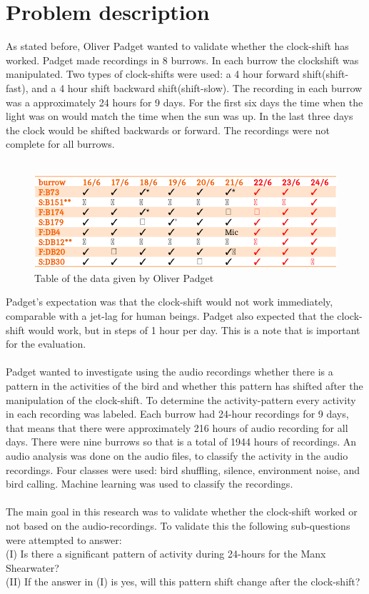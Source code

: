 \documentclass[a4paper]{article}
\begin{document}
\section*{Problem description}
As stated before, Oliver Padget wanted to validate whether the clock-shift has worked. Padget made recordings in 8 burrows. In each burrow the clockshift was manipulated. Two types of clock-shifts were used: a 4 hour forward shift(shift-fast), and a 4 hour shift backward shift(shift-slow). The recording in each burrow was a approximately 24 hours for 9 days. For the first six days the time when the light was on would match the time when the sun was up. In the last three days the clock would be shifted backwards or forward. The recordings were not complete for all burrows.\\\\
\begin{figure}[h]
\caption{Table of the data given by Oliver Padget}
\includegraphics[scale=0.4]{table_of_birds.png}
\end{figure}

Padget's expectation was that the clock-shift would not work immediately, comparable with a jet-lag for human beings.
Padget also expected that the clock-shift would work, but in steps of 1 hour per day. This is a note that is important for the evaluation.\\\\
Padget wanted to investigate using the audio recordings whether there is a pattern in the activities of the bird and whether this pattern has shifted after the manipulation of the clock-shift. To determine the activity-pattern every activity in each recording was labeled. Each burrow had 24-hour recordings for 9 days, that means that there were approximately 216 hours of audio recording for all days. There were nine burrows so that is a total of 1944 hours of recordings. An audio analysis was done on the audio files, to classify the activity in the audio recordings. Four classes were used: bird shuffling, silence, environment noise, and bird calling. Machine learning was used to classify the recordings.\\\\
The main goal in this research was to validate whether the clock-shift worked or not based on the audio-recordings. To validate this the following sub-questions were attempted to answer:\\
 (I)    Is there a significant pattern of activity during 24-hours for the Manx Shearwater?\\
 (II)   If the answer in (I) is yes, will this pattern shift change after the clock-shift?\\
\end{document}
